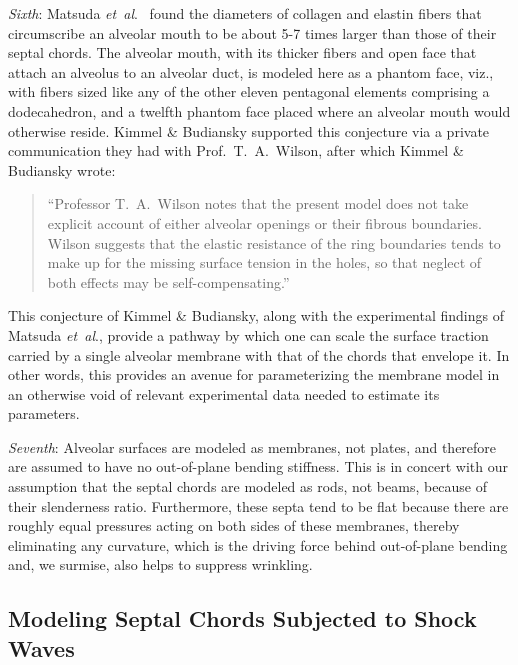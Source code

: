 \textit{Sixth\/}: Matsuda \textit{et~al}.\ \cite{Matsudaetal87} found the diameters of collagen and elastin fibers that circumscribe an alveolar mouth to be about 5-7 times larger than those of their septal chords.  The alveolar mouth, with its thicker fibers and open face that attach an alveolus to an alveolar duct, is modeled here as a phantom face, viz., with fibers sized like any of the other eleven pentagonal elements comprising a dodecahedron, and a twelfth phantom face placed where an alveolar mouth would otherwise reside. \cite{Freedetal12}  Kimmel \& Budiansky supported this conjecture via a private communication they had with Prof.\ T.\ A.\ Wilson, after which  Kimmel \& Budiansky wrote: \cite{KimmelBudiansky90}
\small
\begin{quote}
    ``Professor T.\ A.\ Wilson notes that the present model does not take explicit account of either alveolar openings or their fibrous boundaries.  Wilson suggests that the elastic resistance of the ring boundaries tends to make up for the missing surface tension in the holes, so that neglect of both effects may be self-compensating.''
\end{quote}
\normalsize
This conjecture of Kimmel \& Budiansky, along with the experimental findings of Matsuda \textit{et~al}., provide a pathway by which one can scale the surface traction carried by a single alveolar membrane with that of the chords that envelope it.  In other words, this provides an avenue for parameterizing the membrane model in an other\-wise void of relevant experimental data needed to estimate its parameters.

\textit{Seventh\/}: Alveolar surfaces are modeled as membranes, not plates, and therefore are assumed to have no out-of-plane bending stiffness.  This is in concert with our assumption that the septal chords are modeled as rods, not beams, because of their slenderness ratio.  Furthermore, these septa tend to be flat because there are roughly equal pressures acting on both sides of these membranes, thereby eliminating any curvature, which is the driving force behind out-of-plane bending \cite{HoppinHildebrandt77} and, we surmise, also helps to suppress wrinkling.

\subsection{Modeling Septal Chords Subjected to Shock Waves}

